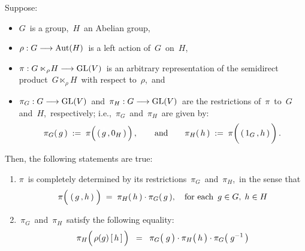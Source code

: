 \vskip 0.5cm
\begin{proposition}
\mbox{}
\vskip 0.1cm
\noindent
Suppose:
\begin{itemize}
\item
	$G$\, is a group, \,$H$\, an {\color{red}Abelian} group,
\item
	$\rho : G \longrightarrow \textnormal{Aut}(H)$\,
	is a left action of \,$G$\, on \,$H$,\,
\item
	$\pi : G \ltimes_{\rho}\! H \longrightarrow \textnormal{GL}(V)$\,
	is an arbitrary representation of the semidirect product
	\,$G \ltimes_{\rho}\! H$\, with respect to \,$\rho$,\, and
\item
	$\pi_{G} : G \longrightarrow \textnormal{GL}(V)$\, and \,$\pi_{H} : G \longrightarrow \textnormal{GL}(V)$\,
	are the restrictions of \,$\pi$\, to \,$G$\, and \,$H$,\, respectively; i.e.,
	\,$\pi_{G}$\, and \,$\pi_{H}$\,
	are given by:
	\begin{equation*}
	\pi_{G}(\,g\,) \; := \; \pi\!\left(\,(\,\overset{{\color{white}1}}{g}\,,0_{H}\,)\,\right),
	\quad\quad
	\textnormal{and}
	\quad\quad
	\pi_{H}(\,h\,) \; := \; \pi\!\left(\,(\,1_{G}\,,\overset{{\color{white}1}}{h}\,)\,\right).
	\end{equation*}
\end{itemize}
Then, the following statements are true:
\begin{enumerate}
\item
	$\pi$\, is completely determined by its restrictions \,$\pi_{G}$\, and \,$\pi_{H}$,\,
	in the sense that
	\begin{equation*}
	\pi\!\left(\;(\,\overset{{\color{white}1}}{g}\,,h\,)\;\right)
	\; = \;
		\pi_{H}(\,h\,) \cdot \pi_{G}(\,g\,),
	\quad
	\textnormal{for each \,$g \in G,\; h \in H$}
	\end{equation*}
\item
	\,$\pi_{G}$\, and \,$\pi_{H}$\, satisfy the following equality:
	\begin{equation*}
	\pi_{H}\!\left(\,\rho(g)\,[\,\overset{{\color{white}.}}{h}\,]\,\right)
	\;\; = \;\;
		\pi_{G}\!\left(\; \overset{{\color{white}.}}{g} \,\right)
		\cdot
		\pi_{H}\!\left(\overset{{\color{white}.}}{{\color{white}g}}\!\! h \,\right)
		\cdot
		\pi_{G}\!\left(\; g^{-1} \,\right)
	\end{equation*}
\end{enumerate}
\end{proposition}
\proof

